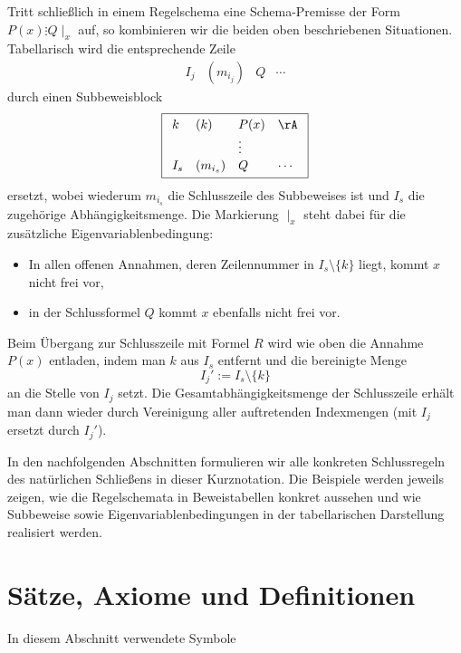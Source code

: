 \documentclass[main.tex]{subfiles}
\begin{document}
Tritt schließlich in einem Regelschema eine Schema-Premisse der Form
\(P(x)\vdots Q\mid_x\) auf, so kombinieren wir die beiden oben
beschriebenen Situationen. Tabellarisch wird die entsprechende
Zeile
\[
  \begin{array}{llll}
    I_j & (m_{i_j}) & Q & \cdots
  \end{array}
\]
durch einen Subbeweisblock
\[
\boxed{%
  \begin{array}{llll}
    k   & (k)       & P(x) & \rA   \\[0.2ex]
        &           &\vdots&       \\[0.2ex]
    I_s & (m_{i_s}) & Q    & \cdots
  \end{array}
}
\]
ersetzt, wobei wiederum \(m_{i_s}\) die Schlusszeile des Subbeweises
ist und \(I_s\) die zugehörige Abhängigkeitsmenge. Die Markierung
\(\mid_x\) steht dabei für die zusätzliche Eigenvariablenbedingung:
\begin{itemize}
  \item In allen offenen Annahmen, deren Zeilennummer in
        \(I_s \setminus \{k\}\) liegt, kommt \(x\) nicht frei vor,
  \item in der Schlussformel \(Q\) kommt \(x\) ebenfalls nicht frei vor.
\end{itemize}
Beim Übergang zur Schlusszeile mit Formel \(R\) wird wie oben die
Annahme \(P(x)\) entladen, indem man \(k\) aus \(I_s\) entfernt und
die bereinigte Menge
\[
  I_j' := I_s \setminus \{k\}
\]
an die Stelle von \(I_j\) setzt. Die Gesamtabhängigkeitsmenge der
Schlusszeile erhält man dann wieder durch Vereinigung aller
auftretenden Indexmengen (mit \(I_j\) ersetzt durch \(I_j'\)).

\medskip

In den nachfolgenden Abschnitten formulieren wir alle konkreten
Schlussregeln des natürlichen Schließens in dieser Kurznotation.
Die Beispiele werden jeweils zeigen, wie die Regelschemata in
Beweistabellen konkret aussehen und wie Subbeweise sowie
Eigenvariablenbedingungen in der tabellarischen Darstellung
realisiert werden.
\section{Sätze, Axiome und Definitionen}

\begin{DeltaContext}{In diesem Abschnitt verwendete Symbole}
\end{DeltaContext}
\end{document}
